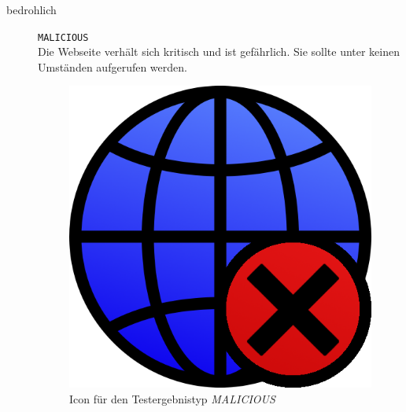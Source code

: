 \begin{description}
    \item[bedrohlich] \hfill \texttt{MALICIOUS} \\
    Die Webseite verhält sich kritisch und ist gefährlich.
    Sie sollte unter keinen Umständen aufgerufen werden.
    \begin{figure}[H]
    	\centering
    	\includegraphics[scale=0.2]{images/webifier-malicious}
    	\caption{Icon für den Testergebnistyp \textit{MALICIOUS}}
    \end{figure}
    

\end{description}
